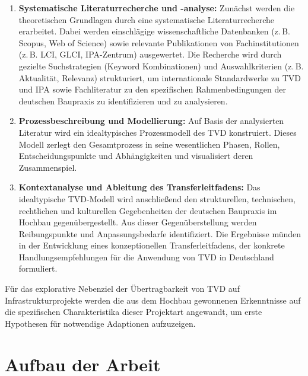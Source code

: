 \begin{enumerate}
    \item \textbf{Systematische Literaturrecherche und -analyse:} Zunächst werden die theoretischen Grundlagen durch eine systematische Literaturrecherche erarbeitet. Dabei werden einschlägige wissenschaftliche Datenbanken (z.\,B. Scopus, Web of Science) sowie relevante Publikationen von Fachinstitutionen (z.\,B. LCI, GLCI, IPA-Zentrum) ausgewertet. Die Recherche wird durch gezielte Suchstrategien (Keyword Kombinationen) und Auswahlkriterien (z.\,B. Aktualität, Relevanz) strukturiert, um internationale Standardwerke zu TVD und IPA sowie Fachliteratur zu den spezifischen Rahmenbedingungen der deutschen Baupraxis zu identifizieren und zu analysieren.
    
    \item \textbf{Prozessbeschreibung und Modellierung:} Auf Basis der analysierten Literatur wird ein idealtypisches Prozessmodell des TVD konstruiert. Dieses Modell zerlegt den Gesamtprozess in seine wesentlichen Phasen, Rollen, Entscheidungspunkte und Abhängigkeiten und visualisiert deren Zusammenspiel.
    
    \item \textbf{Kontextanalyse und Ableitung des Transferleitfadens:} Das idealtypische TVD-Modell wird anschließend den strukturellen, technischen, rechtlichen und kulturellen Gegebenheiten der deutschen Baupraxis im Hochbau gegenübergestellt. Aus dieser Gegenüberstellung werden Reibungspunkte und Anpassungsbedarfe identifiziert. Die Ergebnisse münden in der Entwicklung eines konzeptionellen Transferleitfadens, der konkrete Handlungsempfehlungen für die Anwendung von TVD in Deutschland formuliert.
\end{enumerate}

Für das explorative Nebenziel der Übertragbarkeit von TVD auf Infrastrukturprojekte werden die aus dem Hochbau gewonnenen Erkenntnisse auf die spezifischen Charakteristika dieser Projektart angewandt, um erste Hypothesen für notwendige Adaptionen aufzuzeigen.

\section*{Aufbau der Arbeit}
\label{sec:aufbau}
